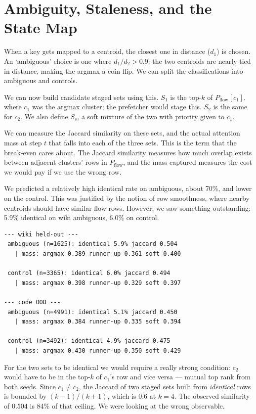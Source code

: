 \documentclass[11pt,a4paper]{article}
\begin{document}
\section{Ambiguity, Staleness, and the State Map}\label{sec:statemap}

When a key gets mapped to a centroid, the closest one in distance ($d_1$) is chosen. An `ambiguous' choice is one where $d_1/d_2 > 0.9$: the two centroids are nearly tied in distance, making the argmax a coin flip. We can split the classifications into ambiguous and controls.

We can now build candidate staged sets using this. $S_1$ is the top-$k$ of $P_{\text{flow}}[c_1]$, where $c_1$ was the argmax cluster; the prefetcher would stage this. $S_2$ is the same for $c_2$. We also define $S_s$, a soft mixture of the two with priority given to $c_1$.

We can measure the Jaccard similarity on these sets, and the actual attention mass at step $t$ that falls into each of the three sets. This is the term that the break-even cares about. The Jaccard similarity measures how much overlap exists between adjacent clusters' rows in $P_{\text{flow}}$, and the mass captured measures the cost we would pay if we use the wrong row.

We predicted a relatively high identical rate on ambiguous, about 70\%, and lower on the control. This was justified by the notion of row smoothness, where nearby centroids should have similar flow rows. However, we saw something outstanding: 5.9\% identical on wiki ambiguous, 6.0\% on control.

{\footnotesize
\begin{verbatim}
--- wiki held-out ---
 ambiguous (n=1625): identical 5.9% jaccard 0.504 
   | mass: argmax 0.389 runner-up 0.361 soft 0.400
   
 control (n=3365): identical 6.0% jaccard 0.494 
   | mass: argmax 0.398 runner-up 0.329 soft 0.397

--- code OOD ---
 ambiguous (n=4991): identical 5.1% jaccard 0.450 
   | mass: argmax 0.384 runner-up 0.335 soft 0.394
   
 control (n=3492): identical 4.9% jaccard 0.475 
   | mass: argmax 0.430 runner-up 0.350 soft 0.429
\end{verbatim}
}

For the two sets to be identical we would require a really strong condition: $c_2$ would have to be in the top-$k$ of $c_1$'s row and vice versa --- mutual top rank from both seeds. Since $c_1 \neq c_2$, the Jaccard of two staged sets built from \emph{identical} rows is bounded by $(k-1)/(k+1)$, which is $0.6$ at $k=4$. The observed similarity of $0.504$ is 84\% of that ceiling. We were looking at the wrong observable.
\end{document}
